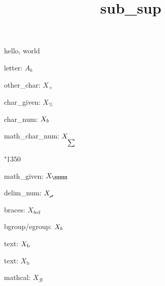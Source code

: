 \documentclass{amsart}
\title{sub\_sup}
\begin{document}
\maketitle

hello, world

letter: $A _b$

other\_char: $X_+$

char\_given: $X_\%$

char\_num: $X_\char`\b$

math\_char\_num: $X_\mathchar"1350$

\mathchardef\SSSSS"1350

math\_given: $X_\SSSSS$

delim\_num: $X_\delimiter"437A340 $

braces: $X_{bcd}$

bgroup/egroup: $X_\bgroup b\egroup$

\def\TEXT#1{{\text{#1}}}


text: $X_ \text b$


text: $X_ \TEXT b$

mathcal: $X_ \mathcal{B}$
\end{document}
